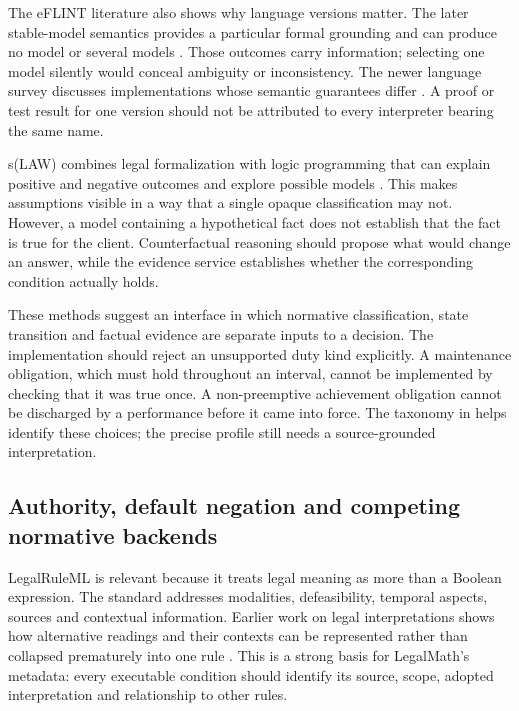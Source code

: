 \documentclass[12pt,a4paper,oneside,openany]{book}
\begin{document}
The eFLINT literature also shows why language versions matter. The later
stable-model semantics provides a particular formal grounding and can produce
no model or several models \citep[translation and evaluation sections]{eflintstable2025}.
Those outcomes carry information; selecting one model silently would conceal
ambiguity or inconsistency. The newer language survey discusses implementations
whose semantic guarantees differ \citep{eflint2026}. A proof or test result for
one version should not be attributed to every interpreter bearing the same name.

s(LAW) combines legal formalization with logic programming that can explain
positive and negative outcomes and explore possible models
\citep[secs.~2--5]{slaw2024}. This makes assumptions visible in a way that a
single opaque classification may not. However, a model containing a hypothetical
fact does not establish that the fact is true for the client. Counterfactual
reasoning should propose what would change an answer, while the evidence
service establishes whether the corresponding condition actually holds.

These methods suggest an interface in which normative classification,
state transition and factual evidence are separate inputs to a decision. The
implementation should reject an unsupported duty kind explicitly. A maintenance
obligation, which must hold throughout an interval, cannot be implemented by
checking that it was true once. A non-preemptive achievement obligation cannot
be discharged by a performance before it came into force. The taxonomy in
\citet[sec.~3]{normative2016} helps identify these choices; the precise profile
still needs a source-grounded interpretation.

\subsection{Authority, default negation and competing normative backends}
\label{merge:P-02-literature:04}


LegalRuleML is relevant because it treats legal meaning as more than a Boolean
expression. The standard addresses modalities, defeasibility, temporal aspects,
sources and contextual information. Earlier work on legal interpretations shows
how alternative readings and their contexts can be represented rather than
collapsed prematurely into one rule
\citep[sec.~4]{legalinterpretations2014,legalruleml2021}. This is a strong basis
for LegalMath's metadata: every executable condition should identify its source,
scope, adopted interpretation and relationship to other rules.
\end{document}
